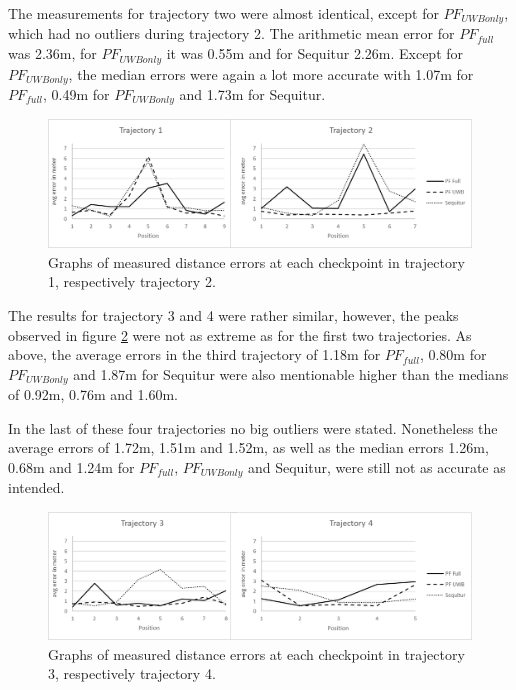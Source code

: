 The measurements for trajectory two were almost identical, except for $PF_{UWBonly}$, which had no outliers during trajectory 2. The arithmetic mean error for $PF_{full}$ was 2.36m, for $PF_{UWBonly}$ it was 0.55m and for Sequitur 2.26m. Except for $PF_{UWBonly}$, the median errors were again a lot more accurate with 1.07m for $PF_{full}$, 0.49m for $PF_{UWBonly}$ and 1.73m for Sequitur.

\begin{figure}[th]
\centering
\includegraphics[width=1.0\textwidth]{Figures/trajectory1_2_results}
\decoRule
\caption[Positioning results trajectory 1 and 2]{Graphs of measured distance errors at each checkpoint in trajectory 1, respectively trajectory 2.}
\label{fig:trajectory1and2_results}
\end{figure}

The results for trajectory 3 and 4 were rather similar, however, the peaks observed in figure \ref{fig:trajectory3and4_results} were not as extreme as for the first two trajectories. As above, the average errors in the third trajectory of 1.18m for $PF_{full}$, 0.80m for $PF_{UWBonly}$ and 1.87m for Sequitur were also mentionable higher than the medians of 0.92m, 0.76m and 1.60m.

In the last of these four trajectories no big outliers were stated. Nonetheless the average errors of 1.72m, 1.51m and 1.52m, as well as the median errors 1.26m, 0.68m and 1.24m for $PF_{full}$, $PF_{UWBonly}$ and Sequitur, were still not as accurate as intended.

\begin{figure}[th]
\centering
\includegraphics[width=1.0\textwidth]{Figures/trajectory3_4_results}
\decoRule
\caption[Positioning results trajectory 3 and 4]{Graphs of measured distance errors at each checkpoint in trajectory 3, respectively trajectory 4.}
\label{fig:trajectory3and4_results}
\end{figure}

